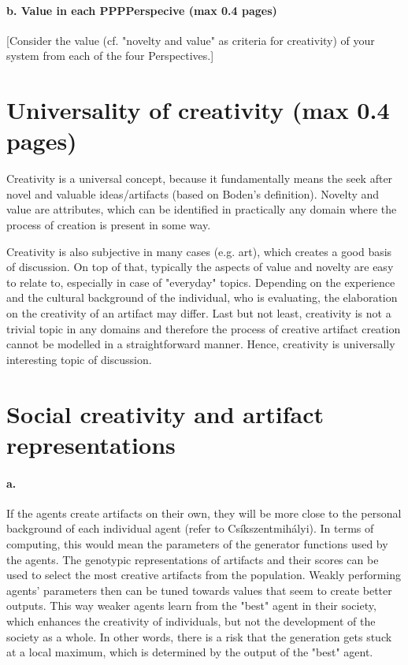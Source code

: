 \documentclass[english]{tktltiki}
\begin{document}
    \paragraph{b. Value in each PPPPerspecive (max 0.4 pages) }
    
    [Consider the value (cf. "novelty and value" as criteria for creativity) of your system from each of the four Perspectives.]
    
    \pagebreak
    \section{Universality of creativity (max 0.4 pages)}
    Creativity is a universal concept, because it fundamentally means the seek after novel and valuable ideas/artifacts (based on Boden's definition). Novelty and value are attributes, which can be identified in practically any domain where the process of creation is present in some way. 
    
    Creativity is also subjective in many cases (e.g. art), which creates a good basis of discussion. On top of that, typically the aspects of value and novelty are easy to relate to, especially in case of "everyday" topics. Depending on the experience and the cultural background of the individual, who is evaluating, the elaboration on the creativity of an artifact may differ. Last but not least, creativity is not a trivial topic in any domains and therefore the process of creative artifact creation cannot be modelled in a straightforward manner. Hence, creativity is universally interesting topic of discussion.
    
    \section{Social creativity and artifact representations}
    
    \paragraph{a.} If the agents create artifacts on their own, they will be more close to the personal background of each individual agent (refer to Cs\'ikszentmih\'alyi). In terms of computing, this would mean the parameters of the generator functions used by the agents. The genotypic representations of artifacts and their scores can be used to select the most creative artifacts from the population. Weakly performing agents' parameters then can be tuned towards values that seem to create better outputs. This way weaker agents learn from the "best" agent in their society, which enhances the creativity of individuals, but not the development of the society as a whole. In other words, there is a risk that the generation gets stuck at a local maximum, which is determined by the output of the "best" agent.
\end{document}
